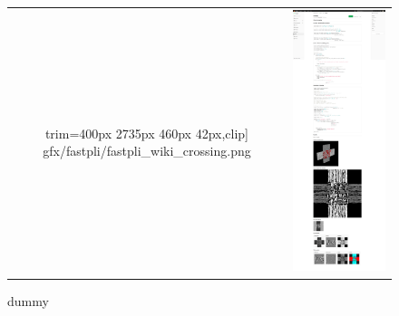 \begin{figure}[!t]
{{\begin{tabular}{c|c}
         					trim={400px 2735px 460px 42px},clip]{
         						gfx/fastpli/fastpli_wiki_crossing.png} &
         	\includegraphics[width=\textwidth,height=\textheight,keepaspectratio,
         					trim={400px 42px 460px 2465px},clip]{
         						gfx/fastpli/fastpli_wiki_crossing.png}  \\
    \end{tabular}
    }}
	\caption{dummy}
	\label{fig:fastpli_wiki_crossing}
\end{figure}
